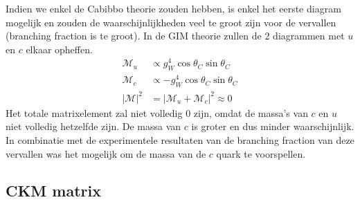 \documentclass[../main.tex]{subfiles}
\begin{document}
Indien we enkel de Cabibbo theorie zouden hebben, is enkel het eerste diagram mogelijk en zouden de waarschijnlijkheden veel te groot zijn voor de vervallen (branching fraction is te groot). In de GIM theorie zullen de 2 diagrammen met $u$ en $c$ elkaar opheffen.
\begin{equation}
    \begin{aligned}
        \label{eq:fcnc_mat_el}
        \mathcal{M}_{u} &\propto g_{W}^{4} \cos \theta_{C} \sin \theta_{C}\\
        \mathcal{M}_{c} &\propto-g_{W}^{4} \cos \theta_{C} \sin \theta_{C}\\
        |\mathcal{M}|^{2}&=\left|\mathcal{M}_{u}+\mathcal{M}_{c}\right|^{2} \approx 0
    \end{aligned}
\end{equation}
Het totale matrixelement zal niet volledig 0 zijn, omdat de massa's van $c$ en $u$ niet volledig hetzelfde zijn. De massa van $c$ is groter en dus minder waarschijnlijk. In combinatie met de experimentele resultaten van de branching fraction van deze vervallen was het mogelijk om de massa van de $c$ quark te voorspellen.

\subsection{CKM matrix}%
\label{sub:ckm_matrix}
\end{document}

